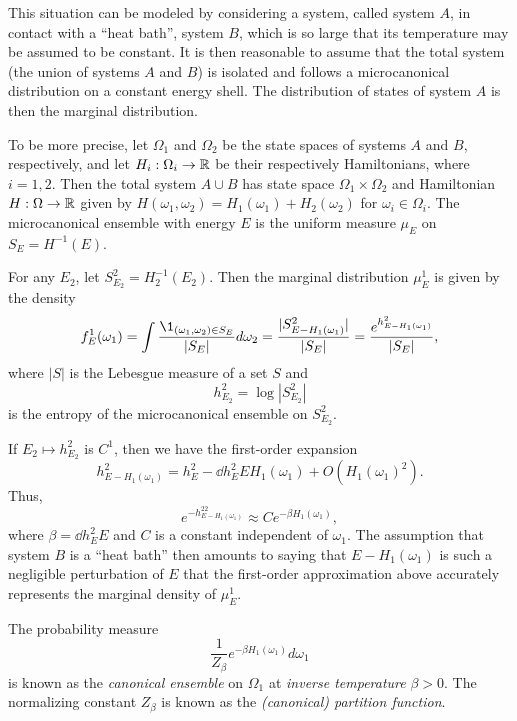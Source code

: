 This situation can be modeled by considering a system, called system $A$, in contact
with a ``heat bath'', system $B$,
which is so large that its temperature may be assumed to be constant.
It is then reasonable to assume that the total system (the union of systems $A$ and $B$)
is isolated and follows a microcanonical distribution on a constant energy shell.
The distribution of states of system $A$ is then the marginal distribution.

To be more precise, let $\Omega_1$ and $\Omega_2$ be the state spaces of systems $A$ and
$B$, respectively, and let $H_i : \Omega_i \rightarrow {\mathbb R}$ be their respectively Hamiltonians,
where $i = 1, 2$. Then the total system $A \cup B$ has state space $\Omega_1 \times \Omega_2$
and Hamiltonian $H : \Omega \rightarrow {\mathbb R}$ given by $H(\omega_1, \omega_2) = H_1(\omega_1) + H_2(\omega_2)$
for $\omega_i \in \Omega_i$. The microcanonical ensemble with energy $E$ is the uniform
measure $\mu_E$ on $S_E = H^{-1}(E)$.

For any $E_2$, let $S^2_{E_2} = H_2^{-1}(E_2)$. Then the marginal distribution $\mu^1_E$
is given by the density
\begin{equation}
f^1_E(\omega_1)
  =
\int \frac{\1_{(\omega_1, \omega_2) \in S_E}}{|S_E|} d\omega_2
  =
\frac{|S^2_{E-H_1(\omega_1)}|}{|S_E|}
  =
\frac{e^{h^2_{E-H_1(\omega_1)}}}{|S_E|},
\end{equation}
where $|S|$ is the Lebesgue measure of a set $S$ and
\begin{equation}
h^2_{E_2} = \log |S^2_{E_2}|
\end{equation}
is the entropy of the microcanonical ensemble on $S^2_{E_2}$.

If $E_2 \mapsto h^2_{E_2}$ is $C^1$, then we have the first-order expansion
\begin{equation}
h^2_{E - H_1(\omega_1)}
  =
h^2_E - \dd{h^2_E}{E} H_1(\omega_1) + O(H_1(\omega_1)^2).
\end{equation}
Thus,
\begin{equation}
e^{-h^22_{E-H_1(\omega_1)}}
  \approx
C e^{-\beta H_1(\omega_1)},
\end{equation}
where $\beta = \dd{h^2_E}{E}$ and $C$ is a constant independent of $\omega_1$.
The assumption that system $B$ is a ``heat bath'' then amounts to saying that
$E - H_1(\omega_1)$ is such a negligible perturbation of $E$ that the first-order
approximation above accurately represents the marginal density of $\mu^1_E$.

The probability measure
\begin{equation}
\frac{1}{Z_\beta} e^{-\beta H_1(\omega_1)} d\omega_1
\end{equation}
is known as the \emph{canonical ensemble} on $\Omega_1$ at \emph{inverse temperature} $\beta > 0$.
The normalizing constant $Z_\beta$ is known as the \emph{(canonical) partition function}.


